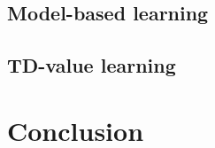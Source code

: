 \documentclass[11pt]{amsart}
\begin{document}
\subsection{Model-based learning}

\subsection{TD-value learning}

\section{Conclusion}


\begingroup
\begin{thebibliography}{9}


\end{thebibliography}
\endgroup
\end{document}
